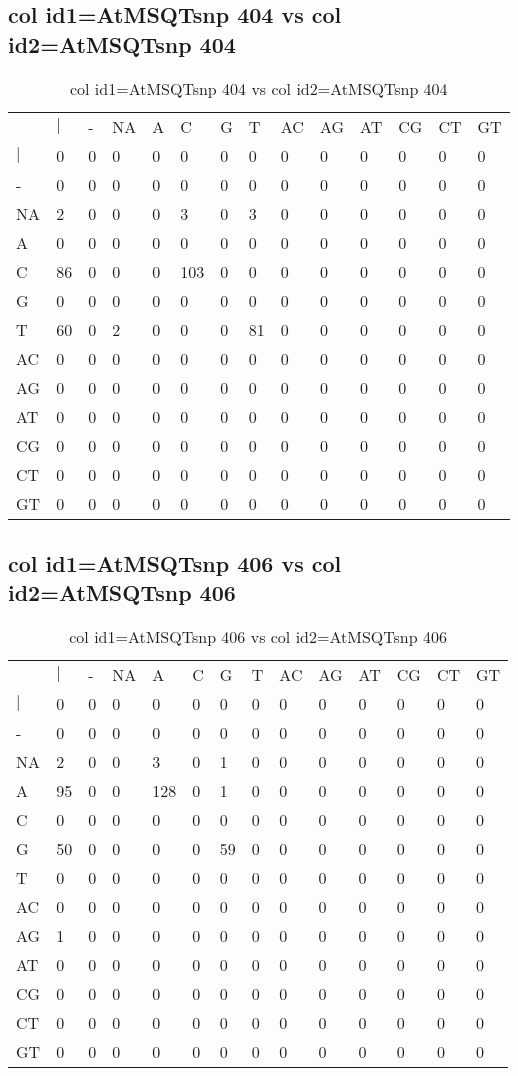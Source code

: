 \subsection{col id1=AtMSQTsnp 404 vs col id2=AtMSQTsnp 404}
\begin{center}
\begin{longtable}{|l|l|l|l|l|l|l|l|l|l|l|l|l|l|}
\caption{col id1=AtMSQTsnp 404 vs col id2=AtMSQTsnp 404} \label{table_dm914}\\
\hline
\\
\hline
&$|$&-&NA&A&C&G&T&AC&AG&AT&CG&CT&GT\\
$|$&0&0&0&0&0&0&0&0&0&0&0&0&0\\
-&0&0&0&0&0&0&0&0&0&0&0&0&0\\
NA&2&0&0&0&3&0&3&0&0&0&0&0&0\\
A&0&0&0&0&0&0&0&0&0&0&0&0&0\\
C&86&0&0&0&103&0&0&0&0&0&0&0&0\\
G&0&0&0&0&0&0&0&0&0&0&0&0&0\\
T&60&0&2&0&0&0&81&0&0&0&0&0&0\\
AC&0&0&0&0&0&0&0&0&0&0&0&0&0\\
AG&0&0&0&0&0&0&0&0&0&0&0&0&0\\
AT&0&0&0&0&0&0&0&0&0&0&0&0&0\\
CG&0&0&0&0&0&0&0&0&0&0&0&0&0\\
CT&0&0&0&0&0&0&0&0&0&0&0&0&0\\
GT&0&0&0&0&0&0&0&0&0&0&0&0&0\\
\hline
\end{longtable}
\end{center}

\subsection{col id1=AtMSQTsnp 406 vs col id2=AtMSQTsnp 406}
\begin{center}
\begin{longtable}{|l|l|l|l|l|l|l|l|l|l|l|l|l|l|}
\caption{col id1=AtMSQTsnp 406 vs col id2=AtMSQTsnp 406} \label{table_dm916}\\
\hline
\\
\hline
&$|$&-&NA&A&C&G&T&AC&AG&AT&CG&CT&GT\\
$|$&0&0&0&0&0&0&0&0&0&0&0&0&0\\
-&0&0&0&0&0&0&0&0&0&0&0&0&0\\
NA&2&0&0&3&0&1&0&0&0&0&0&0&0\\
A&95&0&0&128&0&1&0&0&0&0&0&0&0\\
C&0&0&0&0&0&0&0&0&0&0&0&0&0\\
G&50&0&0&0&0&59&0&0&0&0&0&0&0\\
T&0&0&0&0&0&0&0&0&0&0&0&0&0\\
AC&0&0&0&0&0&0&0&0&0&0&0&0&0\\
AG&1&0&0&0&0&0&0&0&0&0&0&0&0\\
AT&0&0&0&0&0&0&0&0&0&0&0&0&0\\
CG&0&0&0&0&0&0&0&0&0&0&0&0&0\\
CT&0&0&0&0&0&0&0&0&0&0&0&0&0\\
GT&0&0&0&0&0&0&0&0&0&0&0&0&0\\
\hline
\end{longtable}
\end{center}


